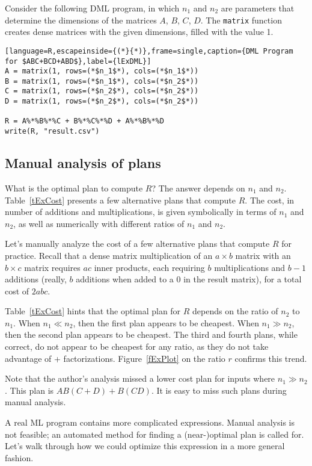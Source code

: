 Consider the following DML program, in which $n_1$ and $n_2$ are parameters that determine the dimensions of the matrices $A$, $B$, $C$, $D$.
The \texttt{matrix} function creates dense matrices with the given dimensions, filled with the value 1.

\begin{lstlisting}[language=R,escapeinside={(*}{*)},frame=single,caption={DML Program for $ABC+BCD+ABD$},label={lExDML}]
A = matrix(1, rows=(*$n_1$*), cols=(*$n_1$*))
B = matrix(1, rows=(*$n_1$*), cols=(*$n_2$*))
C = matrix(1, rows=(*$n_2$*), cols=(*$n_2$*))
D = matrix(1, rows=(*$n_2$*), cols=(*$n_2$*))

R = A%*%B%*%C + B%*%C%*%D + A%*%B%*%D
write(R, "result.csv")
\end{lstlisting}

\subsection{Manual analysis of plans}

What is the optimal plan to compute $R$?
The answer depends on $n_1$ and $n_2$.
Table~\ref{tExCost} presents a few alternative plans that compute $R$.
The cost, in number of additions and multiplications, is given symbolically in terms of $n_1$ and $n_2$, as well as numerically with different ratios of $n_1$ and $n_2$.

Let's manually analyze the cost of a few alternative plans that compute $R$ for practice.
Recall that a dense matrix multiplication of an $a \times b$ matrix with an $b \times c$ matrix requires $ac$ inner products, each requiring $b$ multiplications and $b-1$ additions (really, $b$ additions when added to a 0 in the result matrix), for a total cost of $2abc$.

Table~\ref{tExCost} hints that the optimal plan for $R$ depends on the ratio of $n_2$ to $n_1$.
When $n_1 \ll n_2$, then the first plan appears to be cheapest. 
When $n_1 \gg n_2$, then the second plan appears to be cheapest. 
The third and fourth plans, while correct, do not appear to be cheapest for any ratio, as they do not take advantage of + factorizations.
Figure~\ref{fExPlot} on the ratio $r$ confirms this trend.

Note that the author's analysis missed a lower cost plan for inputs where $n_1 \gg n_2$.  This plan is $AB(C+D) + B(CD)$. It is easy to miss such plans during manual analysis.

A real ML program contains more complicated expressions. Manual analysis is not feasible; an automated method for finding a (near-)optimal plan is called for. Let's walk through how we could optimize this expression in a more general fashion.



